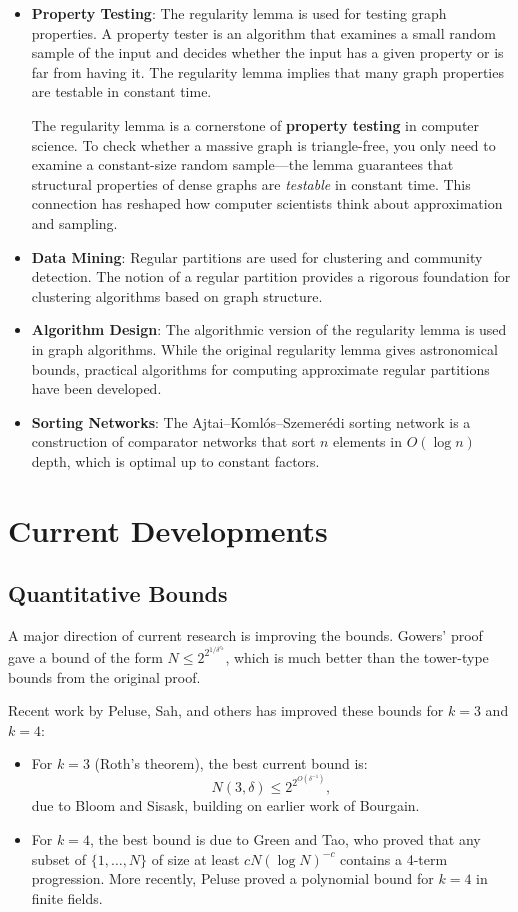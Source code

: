 \begin{itemize}
\item \textbf{Property Testing}: The regularity lemma is used for testing graph properties. A property tester is an algorithm that examines a small random sample of the input and decides whether the input has a given property or is far from having it. The regularity lemma implies that many graph properties are testable in constant time.

\begin{whyitmatters}
The regularity lemma is a cornerstone of \textbf{property testing} in computer science. To check whether a massive graph is triangle-free, you only need to examine a constant-size random sample---the lemma guarantees that structural properties of dense graphs are \emph{testable} in constant time. This connection has reshaped how computer scientists think about approximation and sampling.
\end{whyitmatters}
\item \textbf{Data Mining}: Regular partitions are used for clustering and community detection. The notion of a regular partition provides a rigorous foundation for clustering algorithms based on graph structure.
\item \textbf{Algorithm Design}: The algorithmic version of the regularity lemma is used in graph algorithms. While the original regularity lemma gives astronomical bounds, practical algorithms for computing approximate regular partitions have been developed.
\item \textbf{Sorting Networks}: The Ajtai--Koml\'os--Szemer\'edi sorting network is a construction of comparator networks that sort $n$ elements in $O(\log n)$ depth, which is optimal up to constant factors.
\end{itemize}

\section{Current Developments}

\subsection{Quantitative Bounds}

A major direction of current research is improving the bounds. Gowers' proof gave a bound of the form $N \leq 2^{2^{1/\delta^{c_k}}}$, which is much better than the tower-type bounds from the original proof.

Recent work by Peluse, Sah, and others has improved these bounds for $k=3$ and $k=4$:
\begin{itemize}
\item For $k=3$ (Roth's theorem), the best current bound is:
\[
N(3,\delta) \leq 2^{2^{O(\delta^{-1})}},
\]
due to Bloom and Sisask, building on earlier work of Bourgain.
\item For $k=4$, the best bound is due to Green and Tao, who proved that any subset of $\{1,\ldots,N\}$ of size at least $c N (\log N)^{-c}$ contains a 4-term progression. More recently, Peluse proved a polynomial bound for $k=4$ in finite fields.
\end{itemize}

